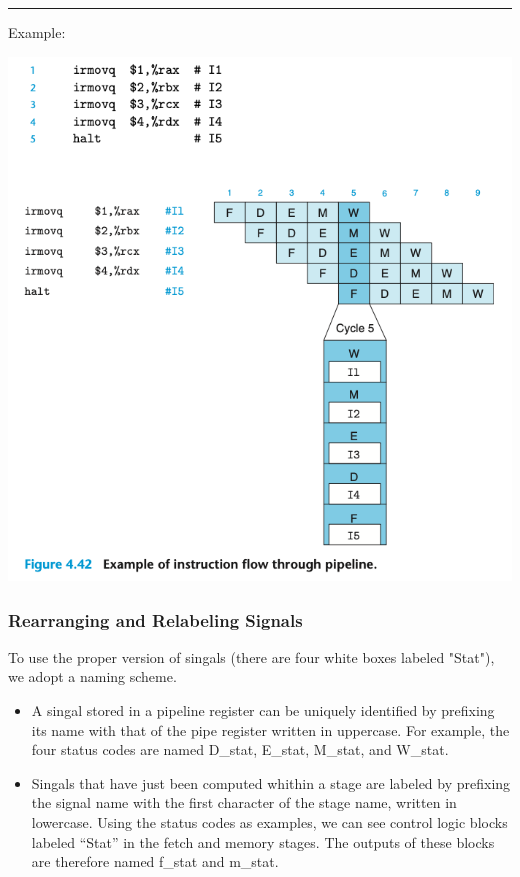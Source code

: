 \documentclass[11pt]{article}
\begin{document}
\noindent\rule{\textwidth}{0.5pt}
Example:\\

\begin{center}
\includegraphics[width=.9\linewidth]{pics/figure4.42-example-of-instruction-flow-through-pipeline.png}
\end{center}

\subsubsection{Rearranging and Relabeling Signals}
\label{sec:org68a2748}

To use the proper version of singals (there are four white boxes labeled "Stat"), we  adopt a naming scheme.\\
\begin{itemize}
\item A singal stored in a pipeline register can be uniquely identified by prefixing its name with that of the pipe register written in uppercase. For example, the four status codes are named D\_stat, E\_stat, M\_stat, and W\_stat.\\
\item Singals that have just been computed whithin a stage are labeled by prefixing the signal name with the first character of the stage name, written in lowercase. Using the status codes as examples, we can see control logic blocks labeled “Stat” in the fetch and memory stages. The outputs of these blocks are therefore named f\_stat and m\_stat.\\
\end{itemize}
\end{document}
